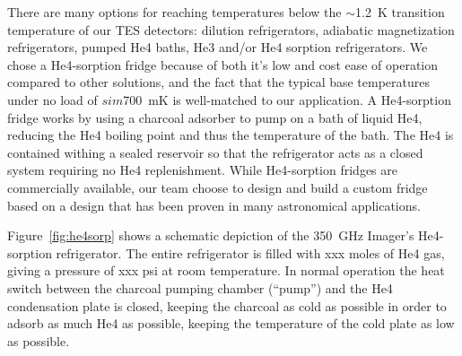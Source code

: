 \documentclass[10pt,twocolumn,article]{memoir}
\newcommand{\figref}[1]{Figure~\ref{#1}}
\newcommand{\TES}{{\small TES}\xspace}
\newcommand{\He}[1]{He#1\xspace}
\begin{document}
There are many options for reaching temperatures below the $\sim$1.2~K transition temperature of our \TES detectors: dilution refrigerators, adiabatic magnetization refrigerators, pumped \He4 baths, \He3 and/or \He4 sorption refrigerators.
We chose a \He4-sorption fridge because of both it's low and cost ease of operation compared to other solutions, and the fact that the typical base temperatures under no load of $sim$700~mK is well-matched to our application.
A  \He4-sorption fridge works by using a charcoal adsorber to pump on a bath of liquid \He4, reducing the \He4 boiling point and thus the temperature of the bath.
The \He4 is contained withing a sealed reservoir so that the refrigerator acts as a closed system requiring no \He4 replenishment. 
While \He4-sorption fridges are commercially available, our team choose to design and build a custom fridge based on a design that has been proven in many astronomical applications\cite{devlin2004high}.

\figref{fig:he4sorp} shows a schematic depiction of the 350~GHz Imager's \He4-sorption refrigerator.
The entire refrigerator is filled with xxx moles of \He4 gas, giving a pressure of xxx psi at room temperature.
In normal operation the heat switch between the charcoal pumping chamber (``pump'') and the \He4 condensation plate is closed, keeping the charcoal as cold as possible in order to adsorb as much \He4 as possible, keeping the temperature of the cold plate as low as possible.
\end{document}
